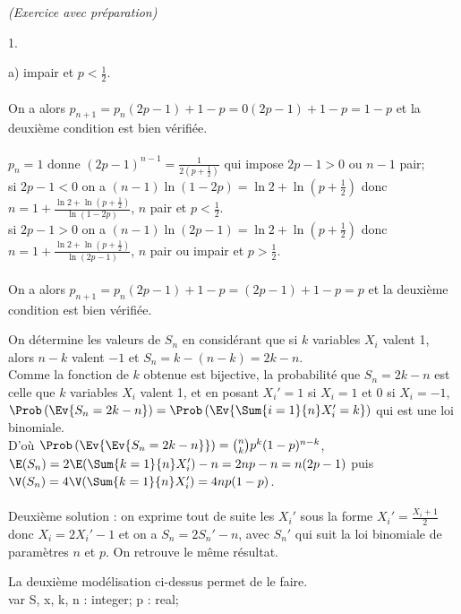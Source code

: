 \documentclass[11pt]{article}%
\begin{document}
\begin{exercice}{\it (Exercice avec préparation)}
\begin{noliste}{1.}
\begin{noliste}{a)}
impair et $p < \frac{1}{2}$. \\
\\
 On a alors $p_{n + 1} = p_{n} ( 2p-1) + 1 - p = 0 (2p-1) + 1-p = 1-p$
et la deuxième condition est bien vérifiée. \\
\\
 $p_{n} = 1$ donne $(2p-1)^{n-1} = \frac{1}{2 \left( p + \frac{1}{2}
\right)} $ qui impose $2p - 1 > 0$ ou $n-1$ pair; \\
 si $2p-1 <0$ on a $(n-1) \ln (1-2p) = \ln 2 + \ln \left( p +
\frac{1}{2} \right)$ donc $n = 1 + \frac{ \ln 2 + \ln \left( p +
\frac{1}{2} \right)}{ \ln (1-2p)}$, $n$ pair et $p < \frac{1}{2}$. \\
 si $2p-1 >0$ on a $(n-1) \ln (2p-1) = \ln 2 + \ln \left( p +
\frac{1}{2} \right)$ donc $n = 1 + \frac{ \ln 2 + \ln \left( p +
\frac{1}{2} \right)}{ \ln (2p-1)}$, $n$ pair ou impair et $p >
\frac{1}{2}$. \\
\\
 On a alors $p_{n + 1} = p_{n} ( 2p-1) + 1 - p = (2p-1) + 1-p = p$ et
la deuxième condition est bien vérifiée. \\
 \end{noliste}
 \item On détermine les valeurs de $S_{n}$ en considérant que si $k$
variables $X_{i}$ valent 1, alors $n-k$ valent $-1$ et $S_{n} = k -
(n-k) = 2k-n$. \\
 Comme la fonction de $k$ obtenue est bijective, la probabilité que
$S_{n} = 2k - n$ est celle que $k$ variables $X_{i}$ valent 1, et en
posant $X_{i}' = 1$ si $X_{i} = 1$ et 0 si $X_{i} = -1$,
$\Prob\left(\Ev{S_{n} = 2k - n}\right) = \Prob\left(\Ev{ \Sum{i = 1}{n}
X_{i}' = k}\right)$ qui est une loi binomiale. \\
 D'où $\Prob\left(\Ev{\Ev{S_{n} = 2k-n}}\right) = \binom{n}{k} p^{k}
(1-p)^{n-k}$, $\E(S_{n}) = 2 \E( \Sum{k = 1}{n} X_{i}' ) -n = 2 n p - n
= n (2p - 1)$ puis $\V(S_{n}) = 4 \V(\Sum{k = 1}{n} X_{i}') = 4 n
p(1-p)$. \\
\\
 Deuxième solution : on exprime tout de suite les $X_{i}'$ sous la
forme $X_{i}' = \frac{X_{i} + 1}{2}$ donc $X_{i} = 2 X_{i}' - 1$ et on
a $S_{n} = 2 S_{n}' -n$, avec $S_{n}'$ qui suit la loi binomiale de
paramètres $n$ et $p$. On retrouve le même résultat. \\
 \item La deuxième modélisation ci-dessus permet de le faire. \\
 var S, x, k, n : integer; p : real; \\

\end{noliste}
\end{exercice}
\end{document}
